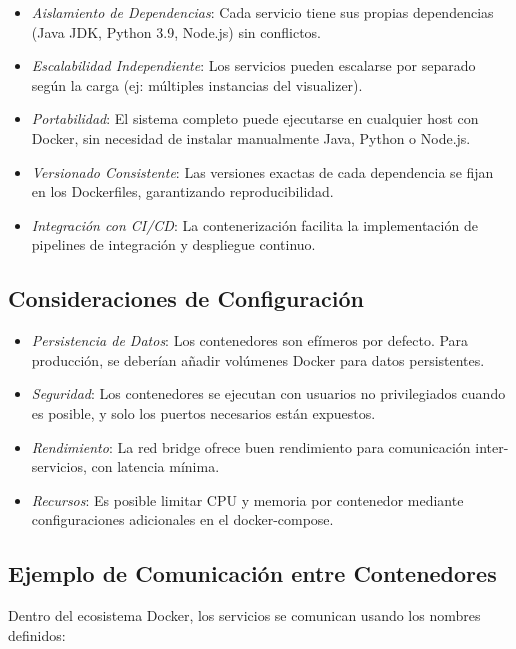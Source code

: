 \documentclass{article}
\begin{document}
\begin{itemize}
    \item \textit{Aislamiento de Dependencias}: Cada servicio tiene sus propias dependencias (Java JDK, Python 3.9, Node.js) sin conflictos.

    \item \textit{Escalabilidad Independiente}: Los servicios pueden escalarse por separado según la carga (ej: múltiples instancias del visualizer).

    \item \textit{Portabilidad}: El sistema completo puede ejecutarse en cualquier host con Docker, sin necesidad de instalar manualmente Java, Python o Node.js.

    \item \textit{Versionado Consistente}: Las versiones exactas de cada dependencia se fijan en los Dockerfiles, garantizando reproducibilidad.

    \item \textit{Integración con CI/CD}: La contenerización facilita la implementación de pipelines de integración y despliegue continuo.
\end{itemize}

\subsection{Consideraciones de Configuración}
\begin{itemize}
    \item \textit{Persistencia de Datos}: Los contenedores son efímeros por defecto. Para producción, se deberían añadir volúmenes Docker para datos persistentes.

    \item \textit{Seguridad}: Los contenedores se ejecutan con usuarios no privilegiados cuando es posible, y solo los puertos necesarios están expuestos.

    \item \textit{Rendimiento}: La red bridge ofrece buen rendimiento para comunicación inter-servicios, con latencia mínima.

    \item \textit{Recursos}: Es posible limitar CPU y memoria por contenedor mediante configuraciones adicionales en el docker-compose.
\end{itemize}

\subsection{Ejemplo de Comunicación entre Contenedores}
Dentro del ecosistema Docker, los servicios se comunican usando los nombres definidos:
\end{document}
